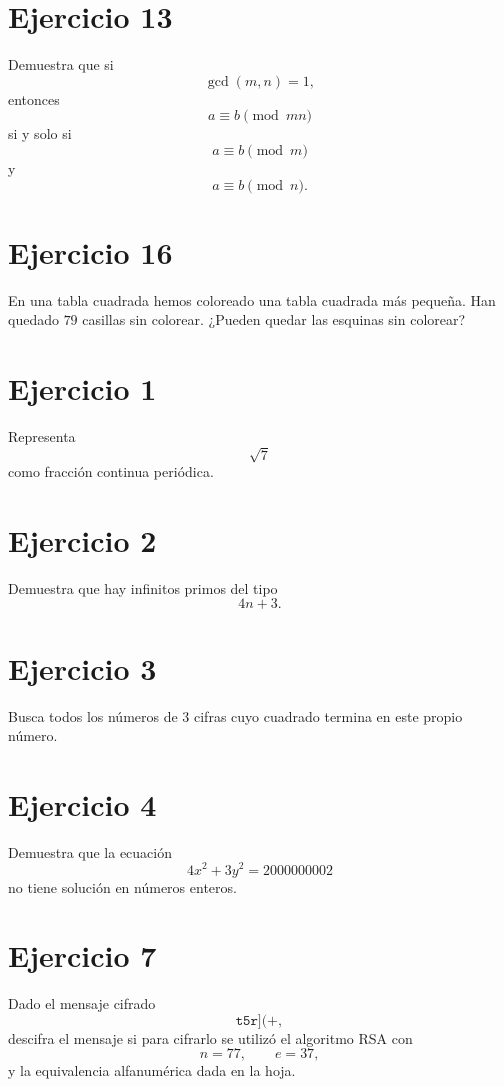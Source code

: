 \documentclass[12pt]{article}
\begin{document}
\section*{Ejercicio 13}
Demuestra que si
\[
\gcd(m,n)=1,
\]
entonces
\[
a\equiv b \pmod{mn}
\]
si y solo si
\[
a\equiv b \pmod m
\]
y
\[
a\equiv b \pmod n.
\]

\vspace{7cm}

\section*{Ejercicio 16}
En una tabla cuadrada hemos coloreado una tabla cuadrada más pequeña.
Han quedado \(79\) casillas sin colorear.
¿Pueden quedar las esquinas sin colorear?

\vspace{7cm}

\section*{Ejercicio 1}
Representa
\[
\sqrt{7}
\]
como fracción continua periódica.

\vspace{20cm}

\section*{Ejercicio 2}
Demuestra que hay infinitos primos del tipo
\[
4n+3.
\]

\vspace{20cm}

\section*{Ejercicio 3}
Busca todos los números de \(3\) cifras cuyo cuadrado termina en este propio número.

\vspace{20cm}

\section*{Ejercicio 4}
Demuestra que la ecuación
\[
4x^2+3y^2=2000000002
\]
no tiene solución en números enteros.

\vspace{20cm}

\section*{Ejercicio 7}
Dado el mensaje cifrado
\[
\texttt{t5r](+},
\]
descifra el mensaje si para cifrarlo se utilizó el algoritmo RSA con
\[
n=77,\qquad e=37,
\]
y la equivalencia alfanumérica dada en la hoja.
\end{document}
